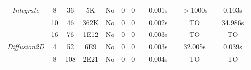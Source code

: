 \begin{savenotes}
\begin{table*}[t]
\begin{center}
\begin{threeparttable}
\begin{tabular}{|c|c|c|c|c|c|c|c|c|c|c|c|c|}
	   \multirow{3}{*}{\textit{Integrate}} & 8 & 36 &  5K
          						        & No  &0 & 0&  & 0.001s &  & $>$1000s &  & 0.103s\\ \cline{2-13}
						       		& 10 & 46 & 362K
          						        & No  &0&0 &  & 0.002s & & TO &  & 34.986s\\ \cline{2-13}
						              & 16 & 76 &  1E12
          						       & No  &0&0 & & 0.003s &  & TO & & TO\\ \hline
						       \hline
						       
						       
	    \multirow{2}{*}{\textit{Diffusion2D}} & 4 & 52 & 6E9 
          						        & No  &0&0 &  & 0.003s &  & 32.005s &   & 0.039s\\ \cline{2-13}
						       		& 8 & 108 & 2E21 
          						         & No  &0 &0 &  & 0.004s &  & TO &  & TO\\ \hline
						       \hline
						       


\end{tabular}
\end{threeparttable}
\end{center}
\end{table*}
\end{savenotes}
